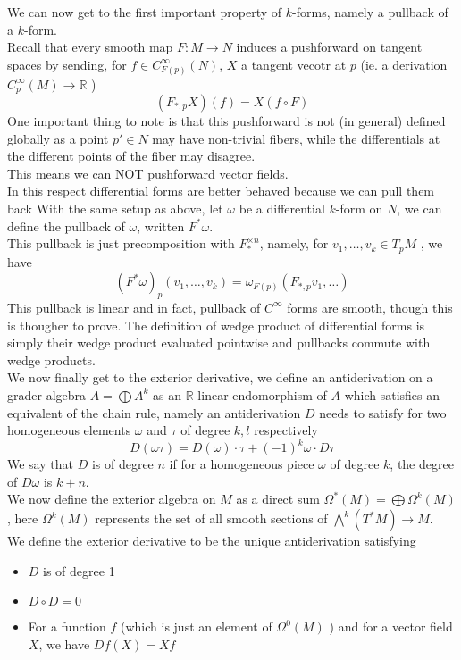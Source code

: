 \documentclass[../main.tex]{subfiles}
\begin{document}
We can now get to the first important property of $k$-forms, namely a pullback of a $k$-form.\\
Recall that every smooth map $F: M\to N$ induces a pushforward on tangent spaces by sending, for $f \in C^{ \infty }_{F( p) }  ( N)$,  $X$ a tangent vecotr at $p$  (ie. a derivation $C^{ \infty }_{p} ( M) \to \mathbb{R}$ ) 
\[ 
	( F_{*,p} X) ( f) = X ( f\circ F) 
\]
One important thing to note is that this pushforward is not (in general) defined globally as a point $p' \in N$ may have non-trivial fibers, while the differentials at the different points of the fiber may disagree.\\
This means we can \underline{NOT} pushforward vector fields.\\

In this respect differential forms are better behaved because we can pull them back 
With the same setup as above, let $\omega$ be a differential $k$-form on $N$, we can define the pullback of $\omega$, written $F^{*}\omega$.\\
This pullback is just precomposition with $ F_\ast^{\times n}$, namely, for $v_1,\ldots,v_k\in T_pM$ , we have
\[ 
( F^{*}\omega )_p( v_1,\ldots, v_k) = \omega_{F( p) } ( F_{*,p} v_1, \ldots) 
\]
This pullback is linear and in fact, pullback of $C^{ \infty }$ forms are smooth, though this is thougher to prove.
The definition of wedge product of differential forms is simply their wedge product evaluated pointwise and pullbacks commute with wedge products.\\

We now finally get to the exterior derivative, we define an antiderivation on a grader algebra $A = \bigoplus A^{k}$ as an $ \mathbb{R}$-linear endomorphism of $A$ which satisfies an equivalent of the chain rule, namely an antiderivation $D$ needs to satisfy for two homogeneous elements $\omega$ and $\tau$ of degree $k,l$ respectively
\[ 
D( \omega \tau) = D( \omega) \cdot \tau + ( -1)^{k} \omega \cdot D\tau
\]
We say that $D$ is of degree $n$ if for a homogeneous piece $\omega$ of degree $k$, the degree of $D\omega$ is $k+n$.\\

We now define the exterior algebra on $M$ as a direct sum $\Omega^{*}( M) = \bigoplus \Omega^{k}( M) $, here $\Omega^{k}( M) $ represents the set of all smooth sections of $\bigwedge^{k}( T^{*}M) \to M$.\\
We define the exterior derivative to be the unique antiderivation satisfying
\begin{itemize}
\item $D$ is of degree 1
\item $D\circ D =0$ 
\item For a function $f$ (which is just an element of $\Omega^{0}( M) $ ) and for a vector field $X$, we have $Df( X) = Xf$ 
\end{itemize}
\end{document}
